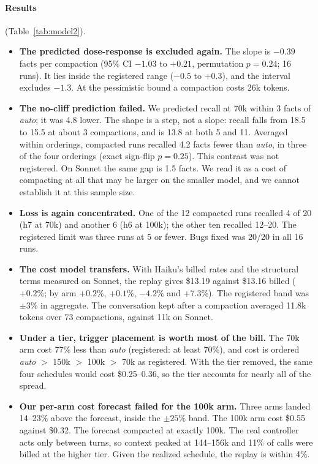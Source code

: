 \documentclass[11pt]{article}
\begin{document}
\paragraph{Results} (Table~\ref{tab:model2}).
\begin{itemize}
\item \textbf{The predicted dose-response is excluded again.} The slope is $-0.39$ facts per compaction (95\% CI $-1.03$ to $+0.21$, permutation $p=0.24$; 16 runs). It lies inside the registered range ($-0.5$ to $+0.3$), and the interval excludes $-1.3$. At the pessimistic bound a compaction costs 26k tokens.
\item \textbf{The no-cliff prediction failed.} We predicted recall at 70k within 3 facts of \emph{auto}; it was 4.8 lower. The shape is a step, not a slope: recall falls from 18.5 to 15.5 at about 3 compactions, and is 13.8 at both 5 and 11. Averaged within orderings, compacted runs recalled 4.2 facts fewer than \emph{auto}, in three of the four orderings (exact sign-flip $p=0.25$). This contrast was not registered. On Sonnet the same gap is 1.5 facts. We read it as a cost of compacting at all that may be larger on the smaller model, and we cannot establish it at this sample size.
\item \textbf{Loss is again concentrated.} One of the 12 compacted runs recalled 4 of 20 (h7 at 70k) and another 6 (h6 at 100k); the other ten recalled 12--20. The registered limit was three runs at 5 or fewer. Bugs fixed was 20/20 in all 16 runs.
\item \textbf{The cost model transfers.} With Haiku's billed rates and the structural terms measured on Sonnet, the replay gives \$13.19 against \$13.16 billed ($+0.2\%$; by arm $+0.2\%$, $+0.1\%$, $-4.2\%$ and $+7.3\%$). The registered band was $\pm3\%$ in aggregate. The conversation kept after a compaction averaged 11.8k tokens over 73 compactions, against 11k on Sonnet.
\item \textbf{Under a tier, trigger placement is worth most of the bill.} The 70k arm cost 77\% less than \emph{auto} (registered: at least 70\%), and cost is ordered \emph{auto} $>$ 150k $>$ 100k $>$ 70k as registered. With the tier removed, the same four schedules would cost \$0.25--0.36, so the tier accounts for nearly all of the spread.
\item \textbf{Our per-arm cost forecast failed for the 100k arm.} Three arms landed 14--23\% above the forecast, inside the $\pm25\%$ band. The 100k arm cost \$0.55 against \$0.32. The forecast compacted at exactly 100k. The real controller acts only between turns, so context peaked at 144--156k and 11\% of calls were billed at the higher tier. Given the realized schedule, the replay is within 4\%.
\end{itemize}
\end{document}
